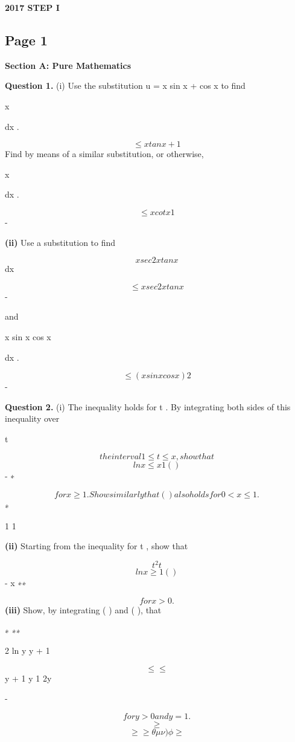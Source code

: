 \documentclass[12pt]{article}
\begin{document}
\begin{center}
{\Large \textbf{2017 STEP I}}
\end{center}

\subsection*{Page 1}
\begin{flushleft}
\bigskip\textbf{Section A: Pure Mathematics}\par
\bigskip\textbf{Question 1.} (i) Use the substitution u = x sin x + cos x to find\par
x\par
dx .\par
\[\leq x tan x + 1\]
Find by means of a similar substitution, or otherwise,\par
x\par
dx .\par
\[\leq x cot x 1\]
-\par
\textbf{(ii)} Use a substitution to find\par
\[x sec2 x tan x\]
dx\par
\[\leq x sec2 x tan x\]
-\par
and\par
x sin x cos x\par
dx .\par
\[\leq (x sin x cos x)2\]
-\par
\bigskip\textbf{Question 2.} (i) The inequality  holds for t . By integrating both sides of this inequality over\par
t\par
\[the interval 1 \leq t \leq x, show that\]
\[ln x \leq x 1 ( )\]
- ∗\par
\[for x \geq 1. Show similarly that ( ) also holds for 0 < x \leq 1.\]
∗\par
1 1\par
\textbf{(ii)} Starting from the inequality \leq for t , show that\par
\[t^2 t\]
\[ln x \geq 1 ( )\]
- x ∗∗\par
\[for x > 0.\]
\textbf{(iii)} Show, by integrating ( ) and ( ), that\par
∗ ∗∗\par
2 ln y y + 1\par
\[\leq \leq\]
y + 1 y 1 2y\par
-\par
\[for y > 0 and y = 1.\]
\[\geq\]
\[\geq\geq\theta\mu\nu) \phi \geq\]
\end{flushleft}
\end{document}
